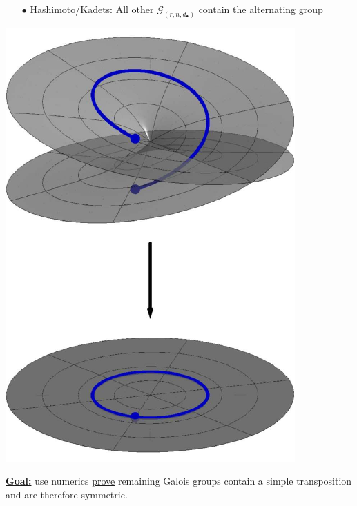 \documentclass{beamer}
\theoremstyle{definition}
\begin{document}
\begin{frame}
\begin{minipage}{.73\textwidth}
\begin{enumerate}
\item[$\bullet$] Hashimoto/Kadets: All other $\mathcal{G}_{(r,n,d_\bullet)}$ contain the alternating group
\end{enumerate}
\end{minipage}
%
\begin{minipage}{.25\textwidth}
\begin{center}
\includegraphics[scale=.5]{figures/monodromy.pdf}
\end{center}
\end{minipage}

\vspace{.25cm}

\textbf{\underline{Goal:}} use numerics \underline{prove} remaining Galois groups contain a simple transposition and are therefore symmetric. 

\end{frame}

\end{document}
